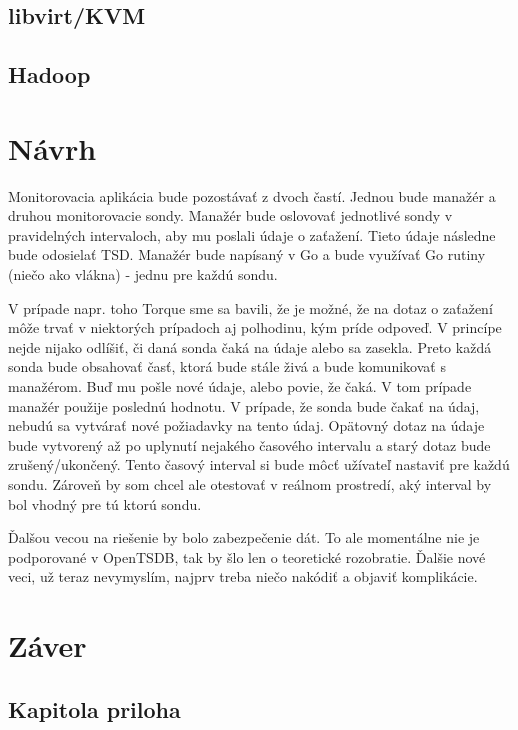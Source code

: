 \documentclass[11pt,final,oneside]{fithesis}
\begin{document}
\section{libvirt/KVM}

\section{Hadoop}

\chapter{Návrh}
Monitorovacia aplikácia bude pozostávať z dvoch častí. Jednou bude manažér a druhou monitorovacie sondy. Manažér bude oslovovať jednotlivé sondy v pravidelných intervaloch, aby mu poslali údaje o zaťažení.
Tieto údaje následne bude odosielať TSD. Manažér bude napísaný v Go a bude využívať Go rutiny (niečo ako vlákna) - jednu pre každú sondu.

V prípade napr. toho Torque sme sa bavili, že je možné, že na dotaz o zaťažení môže trvať v niektorých prípadoch aj polhodinu, kým príde odpoveď. V princípe nejde nijako odlíšiť, či daná sonda čaká na údaje
alebo sa zasekla. Preto každá sonda bude obsahovať časť, ktorá bude stále živá a bude komunikovať s manažérom. Buď mu pošle nové údaje, alebo povie, že čaká. V tom prípade manažér použije poslednú hodnotu.
V prípade, že sonda bude čakať na údaj, nebudú sa vytvárať nové požiadavky na tento údaj. Opätovný dotaz na údaje bude vytvorený až po uplynutí nejakého časového intervalu a starý dotaz bude zrušený/ukončený.
Tento časový interval si bude môcť užívateľ nastaviť pre každú sondu. Zároveň by som chcel ale otestovať v reálnom prostredí, aký interval by bol vhodný pre tú ktorú sondu.

Ďalšou vecou na riešenie by bolo zabezpečenie dát. To ale momentálne nie je podporované v OpenTSDB, tak by šlo len o teoretické rozobratie. Ďalšie nové veci, už teraz nevymyslím, najprv treba niečo nakódiť
a objaviť komplikácie.

\chapter{Záver}


\nocite{*}


\begin{appendix}
\chapter{Kapitola priloha}
\end{appendix}
\end{document}
